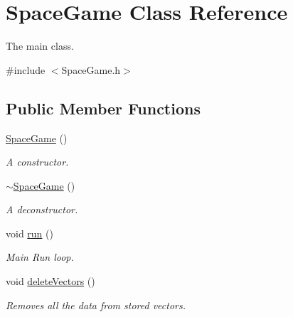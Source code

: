 \hypertarget{class_space_game}{}\section{Space\+Game Class Reference}
\label{class_space_game}


The main class.  




{\ttfamily \#include $<$Space\+Game.\+h$>$}

\subsection*{Public Member Functions}
\begin{DoxyCompactItemize}
\item 
\mbox{\label{class_space_game_a36f837658700f0b32d5b0935231bf721}} 
\hyperlink{class_space_game_a36f837658700f0b32d5b0935231bf721}{Space\+Game} ()
\begin{DoxyCompactList}\small\item\em A constructor. \end{DoxyCompactList}\item 
\mbox{\label{class_space_game_ad166a3a331825b32a484375b80fc17b5}} 
\hyperlink{class_space_game_ad166a3a331825b32a484375b80fc17b5}{$\sim$\+Space\+Game} ()
\begin{DoxyCompactList}\small\item\em A deconstructor. \end{DoxyCompactList}\item 
\mbox{\label{class_space_game_ab266e118927854120d3185722c9e448d}} 
void \hyperlink{class_space_game_ab266e118927854120d3185722c9e448d}{run} ()
\begin{DoxyCompactList}\small\item\em Main Run loop. \end{DoxyCompactList}\item 
\mbox{\label{class_space_game_a5cb4e8dfad6d5080c5d1cec959e40767}} 
void \hyperlink{class_space_game_a5cb4e8dfad6d5080c5d1cec959e40767}{delete\+Vectors} ()
\begin{DoxyCompactList}\small\item\em Removes all the data from stored vectors. \end{DoxyCompactList}\end{DoxyCompactItemize}
